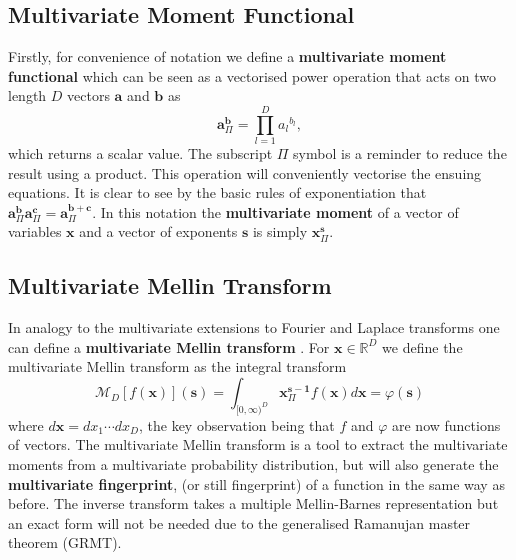 \documentclass{article}
\begin{document}
\subsection{Multivariate Moment Functional}
Firstly, for convenience of notation we define a \textbf{multivariate moment functional} which can be seen as a vectorised power operation that acts on two length $D$ vectors $\mathbf{a}$ and $\mathbf{b}$ as
\begin{equation}
\mathbf{a}^\mathbf{b}_\Pi = \prod_{l=1}^D {a_l}^{b_l},
\end{equation}
which returns a scalar value. The subscript $\Pi$ symbol is a reminder to reduce the result using a product. This operation will conveniently vectorise the ensuing equations. It is clear to see by the basic rules of exponentiation that $\mathbf{a}^\mathbf{b}_\Pi\mathbf{a}^\mathbf{c}_\Pi = \mathbf{a}^{\mathbf{b+c}}_\Pi$.  In this notation the \textbf{multivariate moment} of a vector of variables $\mathbf{x}$ and a vector of exponents $\mathbf{s}$ is simply $\mathbf{x}^\mathbf{s}_\Pi$.

\subsection{Multivariate Mellin Transform}
In analogy to the multivariate extensions to Fourier and Laplace transforms one can define a \textbf{multivariate Mellin transform} \cite{Antipova2007}. For $\mathbf{x} \in \mathbb{R}^D$ we define the multivariate Mellin transform as the integral transform
\begin{equation}
\mathcal{M}_D[f(\mathbf{x})](\mathbf{s}) = \int_{[0,\infty)^D} \mathbf{x}^\mathbf{s-1}_\Pi f(\mathbf{x}) d \mathbf{x} = \varphi(\mathbf{s})
\end{equation}
where $d\mathbf{x} = dx_1 \cdots dx_D$, the key observation being that $f$ and $\varphi$ are now functions of vectors. The multivariate Mellin transform is a tool to extract the multivariate moments from a multivariate probability distribution, but will also generate the \textbf{multivariate fingerprint}, (or still fingerprint) of a function in the same way as before. The inverse transform takes a multiple Mellin-Barnes representation \cite{Passare1996} but an exact form will not be needed due to the generalised Ramanujan master theorem (GRMT).
\end{document}
